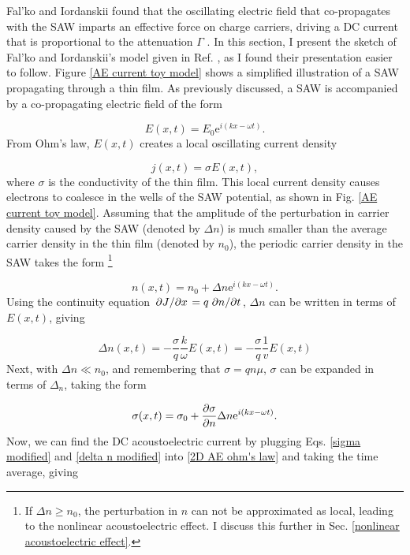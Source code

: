 \documentclass[double,12pt,1in]{beavtex}
\begin{document}
Fal'ko and Iordanskii found that the oscillating electric field that co-propagates with the SAW imparts an effective force on charge carriers, driving a DC current that is proportional to the attenuation $\Gamma$ \cite{falko_acoustoelectric_1993}. In this section, I present the sketch of Fal'ko and Iordanskii's model given in Ref. \cite{esslinger_ultrasonic_1994}, as I found their presentation easier to follow. Figure \ref{AE current toy model} shows a simplified illustration of a SAW propagating through a thin film. As previously discussed, a SAW is accompanied by a co-propagating electric field of the form

\begin{equation}
    E(x, t) = E_0 \mathrm{e}^{i(kx - \omega t)}. \label{SAW plane wave}
\end{equation}
From Ohm's law, $E(x,t)$ creates a local oscillating current density

\begin{equation}
    j(x,t) = \sigma E(x,t), \label{2D AE ohm's law}
\end{equation}
where $\sigma$ is the conductivity of the thin film. This local current density causes  electrons to coalesce in the wells of the SAW potential, as shown in Fig. \ref{AE current toy model}. Assuming that the amplitude of the perturbation in carrier density caused by the SAW (denoted by $\Delta n$) is much smaller than the average carrier density in the thin film (denoted by $n_0$), the periodic carrier density in the SAW takes the form \footnote{If $\Delta n \geq n_0$, the perturbation in $n$ can not be approximated as local, leading to the nonlinear acoustoelectric effect. I discuss this further in Sec. \ref{nonlinear acoustoelectric effect}.}

\begin{equation}
    n(x,t) = n_0 + \Delta n \mathrm{e}^{i(kx - \omega t)}. 
\end{equation}
Using the continuity equation $\pdv*{J}{x} = q \pdv*{n}{t}$, $\Delta n$ can be written in terms of $E(x,t)$, giving

\begin{equation}
    \Delta n(x,t) = -\frac{\sigma}{q} \frac{k}{\omega} E(x,t) = -\frac{\sigma}{q} \frac{1}{v}E(x,t) \label{delta n modified}
\end{equation}
Next, with $\Delta n \ll n_0$, and remembering that $\sigma = q n \mu$, $\sigma$ can be expanded in terms of $\Delta_n$, taking the form

\begin{equation}
    \sigma(x,t) = \sigma_0 + \pdv{\sigma}{n} \Delta n \mathrm{e}^{i(kx - \omega t)} . \label{sigma modified}
\end{equation}
Now, we can find the DC acoustoelectric current by plugging Eqs. \ref{sigma modified} and \ref{delta n modified} into \ref{2D AE ohm's law} and taking the time average, giving
\end{document}

